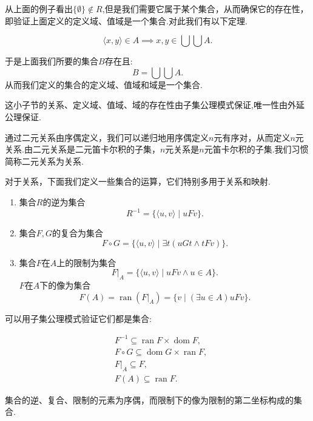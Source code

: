 \begin{note}
    从上面的例子看出$\{\emptyset\}\notin R$,但是我们需要它属于某个集合，从而确保它的存在性，即验证上面定义的定义域、值域是一个集合.对此我们有以下定理.
\end{note}

\begin{theorem}
    [坐标判定]
    \[\langle x,y\rangle\in A\implies x,y\in\bigcup\bigcup A.\]
\end{theorem}
于是上面我们所要的集合$B$存在且:
\[B=\bigcup\bigcup A.\]
从而我们定义的集合的定义域、值域和域是一个集合.
\begin{note}
    这小子节的关系、定义域、值域、域的存在性由子集公理模式保证,唯一性由外延公理保证.
\end{note}

通过二元关系由序偶定义，我们可以递归地用序偶定义$n$元有序对，从而定义$n$元关系.由二元关系是二元笛卡尔积的子集，$n$元关系是$n$元笛卡尔积的子集.我们习惯简称二元关系为关系.

对于关系，下面我们定义一些集合的运算，它们特别多用于关系和映射.

\begin{definition}
    [集合的逆、复合、限制]
    \begin{enumerate}
        \item 集合$R$的逆为集合\[R^{-1}=\{\langle u,v\rangle\mid uFv\}.\]
        \item 集合$F,G$的复合为集合\[F\circ G=\{\langle u,v\rangle\mid \exists t(uGt\wedge tFv)\}.\]
        \item 集合$F$在$A$上的限制为集合\[F|_A=\{\langle u,v\rangle\mid uFv\wedge u\in A\}.\]
        $F$在$A$下的像为集合\[F(A)=\operatorname{ran}(F|_A)=\{v\mid(\exists u\in A)uFv\}.\]
    \end{enumerate}
\end{definition}

可以用子集公理模式验证它们都是集合:

\begin{align*}
    &F^{-1}\subseteq\operatorname{ran}F\times\operatorname{dom}F,\\
    &F\circ G\subseteq\operatorname{dom}G\times\operatorname{ran}F,\\
    &F|_A\subseteq F,\\
    &F(A)\subseteq\operatorname{ran}F.
\end{align*}

\begin{note}
    集合的逆、复合、限制的元素为序偶，而限制下的像为限制的第二坐标构成的集合.
\end{note}

